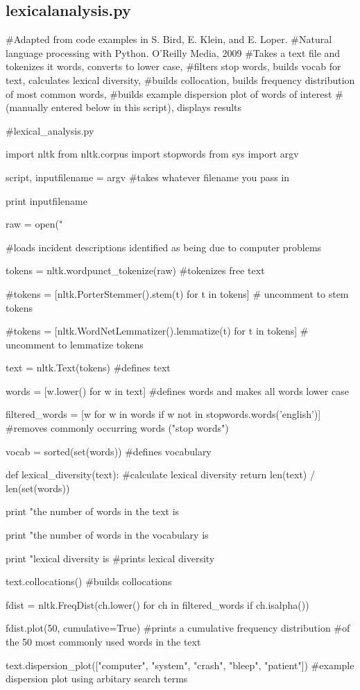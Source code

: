 \subsection{lexicalanalysis.py}
\label{lexical_analysis.py}
\begin{pyverbatim}
#Adapted from code examples in S. Bird, E. Klein, and E. Loper. 
#Natural language processing with Python. O’Reilly Media, 2009
#Takes a text file and tokenizes it words, converts to lower case, 
#filters stop words, builds vocab for text, calculates lexical diversity, 
#builds collocation, builds frequency distribution of most common words, 
#builds example dispersion plot of words of interest 
#(manually entered below in this script), displays results 

#lexical_analysis.py


import nltk
from nltk.corpus import stopwords
from sys import argv

script, inputfilename = argv #takes whatever filename you pass in

print inputfilename

raw = open("%


#loads incident descriptions identified as being due to computer problems

tokens = nltk.wordpunct_tokenize(raw) #tokenizes free text

#tokens = [nltk.PorterStemmer().stem(t) for t in tokens] 
# uncomment to stem tokens

#tokens = [nltk.WordNetLemmatizer().lemmatize(t) for t in tokens]
# uncomment to lemmatize tokens

text = nltk.Text(tokens) #defines text

words = [w.lower() for w in text] 
#defines words and makes all words lower case

filtered_words = [w for w in words if w not in stopwords.words('english')] 
#removes commonly occurring words ("stop words")

vocab = sorted(set(words)) #defines vocabulary

def lexical_diversity(text): #calculate lexical diversity
    return len(text) / len(set(words))

print "the number of words in the text is %

print "the number of words in the vocabulary is %

print "lexical diversity is %
#prints lexical diversity

text.collocations() #builds collocations

fdist = nltk.FreqDist(ch.lower() for ch in filtered_words if ch.isalpha())

fdist.plot(50, cumulative=True) 
#prints a cumulative frequency distribution 
#of the 50 most commonly used words in the text

text.dispersion_plot(["computer", "system", "crash", "bleep", "patient"]) 
#example dispersion plot using arbitary search terms
\end{pyverbatim}

